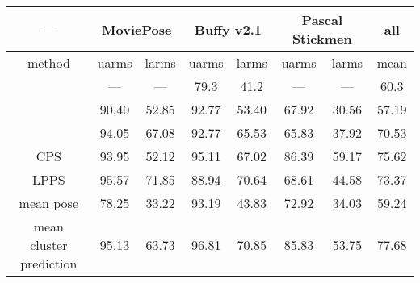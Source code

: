 \begin{tabular}{| c | c | c | c | c |c | c | c |}
\hline
---&\multicolumn{2}{c|}{MoviePose} & \multicolumn{2}{c|}{Buffy v2.1} & \multicolumn{2}{c|}{Pascal Stickmen} & all \\ 
\hline
method & uarms & larms & uarms & larms & uarms & larms & mean \\ 
\hline 
\cite{andriluka09} & --- & --- & 79.3 & 41.2 & --- & --- & 60.3\\ 
\cite{eichner-tr} & 90.40 &52.85 & 92.77	& 53.40	& 67.92	& 30.56	& 57.19 \\
\cite{deva2011} &  94.05 &	67.08 &	92.77 & 65.53 & 65.83 & 37.92 & 70.53 \\
CPS & 93.95 &	52.12 &	95.11 &	67.02 &	86.39 &	59.17 &	75.62 \\
LPPS & 95.57 & 71.85 & 88.94 & 70.64 & 68.61 & 44.58 & 73.37 \\
\hline 
mean pose & 78.25	& 33.22	& 93.19	& 43.83	& 72.92	& 34.03	& 59.24 \\
mean cluster prediction & 95.13	& 63.73	& 96.81	& 70.85	& 85.83	& 53.75	& 77.68 \\
\hline 
\end{tabular}



